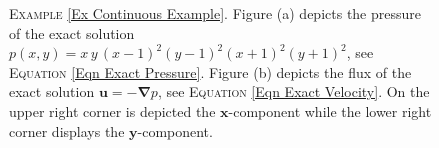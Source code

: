 \documentclass[3p]{elsarticle}
\def\u{\mathbf u}
\def\grad{\bm{\nabla}}
\begin{document}
\begin{example}
\begin{figure}[t]
	\caption{\textsc{Example} \ref{Ex Continuous Example}. Figure (a) depicts the pressure of the exact solution $p(x, y) =  x \, y \, (x -1)^{2} (y - 1)^{2}(x + 1)^{2}(y + 1)^{2}$, see \textsc{Equation} \eqref{Eqn Exact Pressure}.
	Figure (b) depicts the flux of the exact solution 
	$ \u = - \grad p 
	$, see \textsc{Equation} \eqref{Eqn Exact Velocity}. On the upper right corner is depicted the $\boldsymbol{x}$-component while the lower right corner displays the $\boldsymbol{y}$-component. \label{Fig Exact Solution Numerical Example} }
\end{figure}
%
%
%
%
\begin{figure}[h] %
	\centering
	\begin{subfigure}
	[Pressure Approximate Solution. ]
		{\resizebox{7.8cm}{8.0cm}
			{\texttt{[image: Approx\_Pressure.pdf]} } 
			}
	\end{subfigure} %
	~ %
	\begin{subfigure}[Flux Approximate Solution.]
		{\resizebox{7.8cm}{8.0cm}
			{\texttt{[image: Approx\_Velocity.pdf]} } 
			}                
	\end{subfigure} %

\end{figure}
\end{example}
\end{document}
